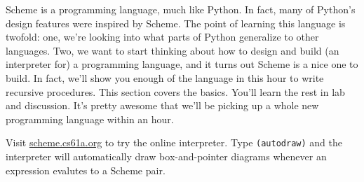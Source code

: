 Scheme is a programming language, much like Python. In fact, many of Python's design features were inspired by Scheme. The point of learning this language is twofold: one, we're looking into what parts of Python generalize to other languages. Two, we want to start thinking about how to design and build (an interpreter for) a programming language, and it turns out Scheme is a nice one to build. In fact, we'll show you enough of the language in this hour to write recursive procedures. This section covers the basics. You'll learn the rest in lab and discussion. It's pretty awesome that we'll be picking up a whole new programming language within an hour.

Visit \url{scheme.cs61a.org} to try the online interpreter. Type \lstinline$(autodraw)$
and the interpreter will automatically draw box-and-pointer diagrams whenever an expression
evalutes to a Scheme pair.
